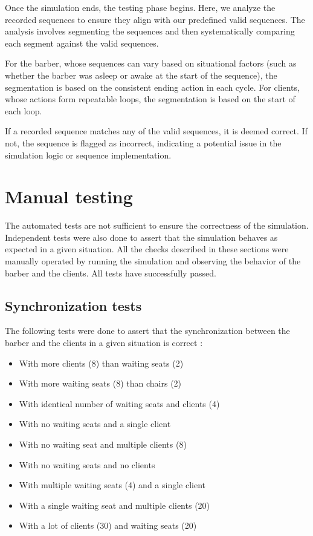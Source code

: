 \documentclass{article}
\begin{document}
    Once the simulation ends, the testing phase begins.
    Here, we analyze the recorded sequences to ensure they align with our predefined valid sequences.
    The analysis involves segmenting the sequences and then systematically comparing each segment against the valid sequences.

    For the barber, whose sequences can vary based on situational factors (such as whether the barber was asleep or awake at the start of the sequence), the segmentation is based on the consistent ending action in each cycle.
    For clients, whose actions form repeatable loops, the segmentation is based on the start of each loop.

    If a recorded sequence matches any of the valid sequences, it is deemed correct.
    If not, the sequence is flagged as incorrect, indicating a potential issue in the simulation logic or sequence implementation.

    \section{Manual testing}

    The automated tests are not sufficient to ensure the correctness of the simulation.
    Independent tests were also done to assert that the simulation behaves as expected in a given situation.
    All the checks described in these sections were manually operated by running the simulation and observing the behavior of the barber and the clients.
    All tests have successfully passed.

    \subsection{Synchronization tests}
    The following tests were done to assert that the synchronization between the barber and the clients in a given situation is correct :
    \begin{itemize}
        \item With more clients (8) than waiting seats (2)
        \item With more waiting seats (8) than chairs (2)
        \item With identical number of waiting seats and clients (4)
        \item With no waiting seats and a single client
        \item With no waiting seat and multiple clients (8)
        \item With no waiting seats and no clients
        \item With multiple waiting seats (4) and a single client
        \item With a single waiting seat and multiple clients (20)
        \item With a lot of clients (30) and waiting seats (20)
    \end{itemize}
\end{document}
